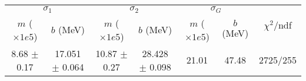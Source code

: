 \begin{tabular}{cc|cc|cc||c}
\multicolumn{2}{c|}{$\sigma_1$} & \multicolumn{2}{|c}{$\sigma_2$} & \multicolumn{2}{|c}{$\sigma_G$}  & \multirow{2}{*}{$\chi^2/$ndf}\\
$m$ ($\times1e5$) & $b$ (MeV) & $m$ ($\times1e5$) & $b$ (MeV) & $m$ ($\times1e5$) & $b$ (MeV) & \\
\hline
8.68 $\pm$ 0.17 & 17.051 $\pm$ 0.064 & 10.87 $\pm$ 0.27 & 28.428 $\pm$ 0.098 & 21.01 & 47.48 & 2725/255\\
\end{tabular}

